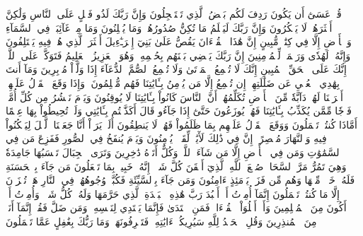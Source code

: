 قُلۡ عَسَىٰٓ أَن يَكُونَ رَدِفَ لَكُم بَعۡضُ ٱلَّذِي تَسۡتَعۡجِلُونَ
وَإِنَّ رَبَّكَ لَذُو فَضۡلٍ عَلَى ٱلنَّاسِ وَلَٰكِنَّ أَكۡثَرَهُمۡ لَا يَشۡكُرُونَ
وَإِنَّ رَبَّكَ لَيَعۡلَمُ مَا تُكِنُّ صُدُورُهُمۡ وَمَا يُعۡلِنُونَ
وَمَا مِنۡ غَآئِبَةٖ فِي ٱلسَّمَآءِ وَٱلۡأَرۡضِ إِلَّا فِي كِتَٰبٖ مُّبِينٍ
إِنَّ هَٰذَا ٱلۡقُرۡءَانَ يَقُصُّ عَلَىٰ بَنِيٓ إِسۡرَـٰٓءِيلَ أَكۡثَرَ ٱلَّذِي هُمۡ فِيهِ يَخۡتَلِفُونَ
وَإِنَّهُۥ لَهُدٗى وَرَحۡمَةٞ لِّلۡمُؤۡمِنِينَ
إِنَّ رَبَّكَ يَقۡضِي بَيۡنَهُم بِحُكۡمِهِۦۚ وَهُوَ ٱلۡعَزِيزُ ٱلۡعَلِيمُ
فَتَوَكَّلۡ عَلَى ٱللَّهِۖ إِنَّكَ عَلَى ٱلۡحَقِّ ٱلۡمُبِينِ
إِنَّكَ لَا تُسۡمِعُ ٱلۡمَوۡتَىٰ وَلَا تُسۡمِعُ ٱلصُّمَّ ٱلدُّعَآءَ إِذَا وَلَّوۡاْ مُدۡبِرِينَ
وَمَآ أَنتَ بِهَٰدِي ٱلۡعُمۡيِ عَن ضَلَٰلَتِهِمۡۖ إِن تُسۡمِعُ إِلَّا مَن يُؤۡمِنُ بِـَٔايَٰتِنَا فَهُم مُّسۡلِمُونَ
۞وَإِذَا وَقَعَ ٱلۡقَوۡلُ عَلَيۡهِمۡ أَخۡرَجۡنَا لَهُمۡ دَآبَّةٗ مِّنَ ٱلۡأَرۡضِ تُكَلِّمُهُمۡ أَنَّ ٱلنَّاسَ كَانُواْ بِـَٔايَٰتِنَا لَا يُوقِنُونَ
وَيَوۡمَ نَحۡشُرُ مِن كُلِّ أُمَّةٖ فَوۡجٗا مِّمَّن يُكَذِّبُ بِـَٔايَٰتِنَا فَهُمۡ يُوزَعُونَ
حَتَّىٰٓ إِذَا جَآءُو قَالَ أَكَذَّبۡتُم بِـَٔايَٰتِي وَلَمۡ تُحِيطُواْ بِهَا عِلۡمًا أَمَّاذَا كُنتُمۡ تَعۡمَلُونَ
وَوَقَعَ ٱلۡقَوۡلُ عَلَيۡهِم بِمَا ظَلَمُواْ فَهُمۡ لَا يَنطِقُونَ
أَلَمۡ يَرَوۡاْ أَنَّا جَعَلۡنَا ٱلَّيۡلَ لِيَسۡكُنُواْ فِيهِ وَٱلنَّهَارَ مُبۡصِرًاۚ إِنَّ فِي ذَٰلِكَ لَأٓيَٰتٖ لِّقَوۡمٖ يُؤۡمِنُونَ
وَيَوۡمَ يُنفَخُ فِي ٱلصُّورِ فَفَزِعَ مَن فِي ٱلسَّمَٰوَٰتِ وَمَن فِي ٱلۡأَرۡضِ إِلَّا مَن شَآءَ ٱللَّهُۚ وَكُلٌّ أَتَوۡهُ دَٰخِرِينَ
وَتَرَى ٱلۡجِبَالَ تَحۡسَبُهَا جَامِدَةٗ وَهِيَ تَمُرُّ مَرَّ ٱلسَّحَابِۚ صُنۡعَ ٱللَّهِ ٱلَّذِيٓ أَتۡقَنَ كُلَّ شَيۡءٍۚ إِنَّهُۥ خَبِيرُۢ بِمَا تَفۡعَلُونَ
مَن جَآءَ بِٱلۡحَسَنَةِ فَلَهُۥ خَيۡرٞ مِّنۡهَا وَهُم مِّن فَزَعٖ يَوۡمَئِذٍ ءَامِنُونَ
وَمَن جَآءَ بِٱلسَّيِّئَةِ فَكُبَّتۡ وُجُوهُهُمۡ فِي ٱلنَّارِ هَلۡ تُجۡزَوۡنَ إِلَّا مَا كُنتُمۡ تَعۡمَلُونَ
إِنَّمَآ أُمِرۡتُ أَنۡ أَعۡبُدَ رَبَّ هَٰذِهِ ٱلۡبَلۡدَةِ ٱلَّذِي حَرَّمَهَا وَلَهُۥ كُلُّ شَيۡءٖۖ وَأُمِرۡتُ أَنۡ أَكُونَ مِنَ ٱلۡمُسۡلِمِينَ
وَأَنۡ أَتۡلُوَاْ ٱلۡقُرۡءَانَۖ فَمَنِ ٱهۡتَدَىٰ فَإِنَّمَا يَهۡتَدِي لِنَفۡسِهِۦۖ وَمَن ضَلَّ فَقُلۡ إِنَّمَآ أَنَا۠ مِنَ ٱلۡمُنذِرِينَ
وَقُلِ ٱلۡحَمۡدُ لِلَّهِ سَيُرِيكُمۡ ءَايَٰتِهِۦ فَتَعۡرِفُونَهَاۚ وَمَا رَبُّكَ بِغَٰفِلٍ عَمَّا تَعۡمَلُونَ